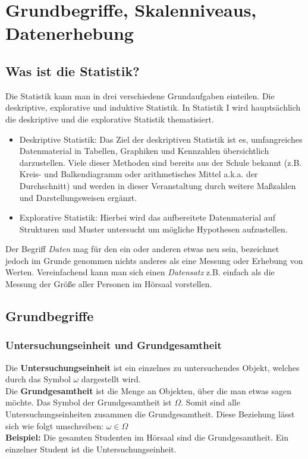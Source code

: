 \documentclass[a4paper]{article}
\begin{document}

\section{Grundbegriffe, Skalenniveaus, Datenerhebung}

\subsection{Was ist die Statistik?}

Die Statistik kann man in drei verschiedene Grundaufgaben einteilen. Die deskriptive, explorative und induktive Statistik. In Statistik I wird hauptsächlich die deskriptive und die explorative Statistik thematisiert.
\begin{itemize}
     \item Deskriptive Statistik: Das Ziel der deskriptiven Statistik ist es, umfangreiches Datenmaterial in Tabellen, Graphiken und Kennzahlen übersichtlich darzustellen. Viele dieser Methoden sind bereits aus der Schule bekannt (z.B. Kreis- und Balkendiagramm oder arithmetisches Mittel a.k.a. der Durchschnitt) und werden in dieser Veranstaltung durch weitere Ma\ss{}zahlen und Darstellungsweisen erg\"anzt.
     \item Explorative Statistik: Hierbei wird das aufbereitete Datenmaterial auf Strukturen und Muster untersucht um mögliche Hypothesen aufzustellen.
\end{itemize}

\noindent Der Begriff \textit{Daten} mag f\"ur den ein oder anderen etwas neu sein, bezeichnet jedoch im Grunde genommen nichts anderes als eine Messung oder Erhebung von Werten. Vereinfachend kann man sich einen \textit{Datensatz} z.B. einfach als die Messung der Gr\"o\ss{}e aller Personen im H\"orsaal vorstellen.

\subsection{Grundbegriffe}
\subsubsection{Untersuchungseinheit und Grundgesamtheit}
Die \textbf{Untersuchungseinheit} ist ein einzelnes zu untersuchendes Objekt, welches durch das Symbol $\omega$ dargestellt wird.
\\Die \textbf{Grundgesamtheit} ist die Menge an Objekten, über die man etwas sagen möchte. Das Symbol der Grundgesamtheit ist $\Omega$. Somit sind alle Untersuchungseinheiten zusammen die Grundgesamtheit. Diese Beziehung lässt sich wie folgt umschreiben: $\omega \in \Omega$
\\ \textbf{Beispiel:} Die gesamten Studenten im H\"orsaal sind die Grundgesamtheit. Ein einzelner Student ist die Untersuchungseinheit.
\end{document}
